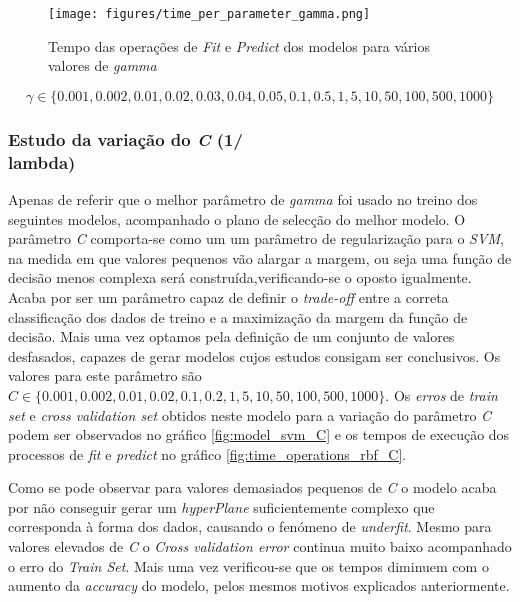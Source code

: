 \begin{figure}[htp]
\centering
\texttt{[image: figures/time\_per\_parameter\_gamma.png]}
\caption{Tempo das operações de \textit{Fit} e \textit{Predict} dos modelos para vários valores de \textit{gamma}}
\label{fig:time_operations_gama}
\end{figure}

\begin{figure*}[!t]
\begin{equation}
    \gamma \in \{0.001, 0.002, 0.01, 0.02, 0.03, 0.04, 0.05, 0.1, 0.5, 1, 5, 10, 50, 100, 500, 1000\}
\label{gamma_values}
\end{equation}
\end{figure*}

\subsubsection{Estudo da variação do \textit{C} (1/\\lambda)}
Apenas de referir que o melhor parâmetro de \textit{gamma} foi usado no treino dos seguintes modelos, acompanhado o plano de selecção do melhor modelo.
O parâmetro \textit{C} comporta-se como um um parâmetro de regularização para o \textit{SVM}, na medida em que valores pequenos vão alargar a margem, ou seja uma função de decisão menos complexa será construída,verificando-se o oposto igualmente. Acaba por ser um parâmetro capaz de definir o \textit{trade-off} entre a correta classificação dos dados de treino e a maximização da margem da função de decisão.
Mais uma vez optamos pela definição de um conjunto de valores desfasados, capazes de gerar modelos cujos estudos consigam ser conclusivos. Os valores para este parâmetro são $\textit{C} \in \{0.001, 0.002, 0.01, 0.02, 0.1, 0.2, 1, 5, 10, 50, 100, 500, 1000\}$.
Os \textit{erros} de \textit{train set} e \textit{cross validation set} obtidos neste modelo para a variação do parâmetro \textit{C} podem ser observados no gráfico \ref{fig:model_svm_C} e os tempos de execução dos processos de \textit{fit} e \textit{predict} no gráfico \ref{fig:time_operations_rbf_C}.

Como se pode observar para valores demasiados pequenos de \textit{C} o modelo acaba por não conseguir gerar um \textit{hyperPlane} suficientemente complexo que corresponda à forma dos dados, causando o fenómeno de \textit{underfit}. Mesmo para valores elevados de \textit{C} o \textit{Cross validation error} continua muito baixo acompanhado o erro do \textit{Train Set}.
Mais uma vez verificou-se que os tempos diminuem com o aumento da \textit{accuracy} do modelo, pelos mesmos motivos explicados anteriormente.


